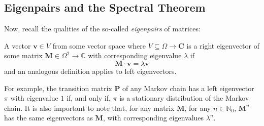 	\subsection{Eigenpairs and the Spectral Theorem}

	Now, recall the qualities of the so-called \emph{eigenpairs} of matrices: 
	\begin{definition}
		A vector $\mathbf{v} \in V$ from some vector space where $V\subseteq \Omega 
		\rightarrow \mathbf{C}$ is a right eigenvector of some matrix $\mathbf{M} \in 
		\Omega^2 \rightarrow \mathbb{C}$ with corresponding eigenvalue $\lambda$ if 
		$$
			\mathbf{M}\cdot\mathbf{v} = \lambda \mathbf{v}
		$$
		and an analogous definition applies to left eigenvectors.
	\end{definition}
	For example, the transition matrix $\mathbf{P}$ of any Markov chain has a left eigenvector 
	$\pi$ with eigenvalue $1$ if, and only if, $\pi$ is a stationary distribution of the Markov 
	chain. It is also important to note that, for any matrix $\mathbf{M}$, for any $n\in
	\mathbb{N}_0$, $\mathbf{M}^n$ has the same eigenvectors as $\mathbf{M}$, with corresponding 
	eigenvalues $\lambda^n$.

